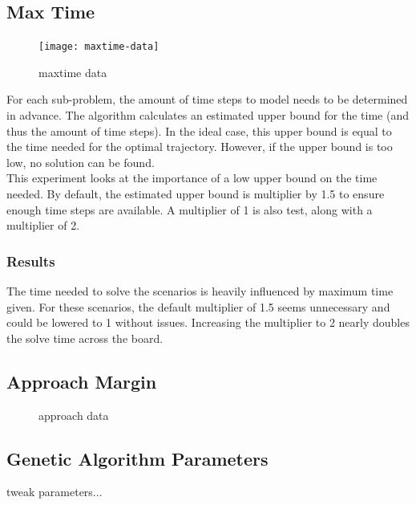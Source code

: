\subsection{Max Time}
\label{subsec:maxtime}
\begin{figure}[]
	\centering
	\texttt{[image: maxtime-data]}
	\caption{maxtime data}
	\label{fig:maxtime-data}
\end{figure}
For each sub-problem, the amount of time steps to model needs to be determined in advance. The algorithm calculates an estimated upper bound for the time (and thus the amount of time steps). In the ideal case, this upper bound is equal to the time needed for the optimal trajectory. However, if the upper bound is too low, no solution can be found.\\

This experiment looks at the importance of a low upper bound on the time needed. By default, the estimated upper bound is multiplier by 1.5 to ensure enough time steps are available. A multiplier of 1 is also test, along with a multiplier of 2. \\

\subsubsection{Results}
The time needed to solve the scenarios is heavily influenced by maximum time given. For these scenarios, the default multiplier of 1.5 seems unnecessary and could be lowered to 1 without issues. Increasing the multiplier to 2 nearly doubles the solve time across the board.


\clearpage
\subsection{Approach Margin}
\label{subsec:approach-margin}
\begin{figure}[]
	\centering
	\caption{approach data}
	\label{fig:approach-data}
\end{figure}

\clearpage
\subsection{Genetic Algorithm Parameters}
\label{subsec:ga-params}
tweak parameters...


